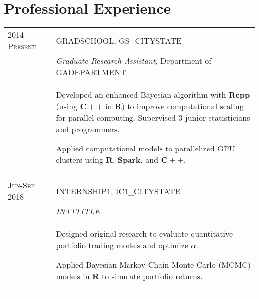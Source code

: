 \documentclass[a4paper,10pt]{article}
\begin{document}
\section{Professional Experience}
\begin{supertabular}{l p{0.55cm} p{13.9cm}}
	\textsc{2014-Present}				&& \textsc{GRADSCHOOL}, GS_CITYSTATE \\
	\small\textsc{}							&& \small	\emph{Graduate Research Assistant}, \small Department of GADEPARTMENT \\
															&& \begin{enumerate*}[label =$\diamond$,itemjoin={\newline}]
																	\item \footnotesize Developed an enhanced Bayesian algorithm with $\mathbf{Rcpp}$ (using $\mathbf{C++}$ in $\mathbf{R}$) to improve computational scaling for parallel computing. Supervised 3 junior statisticians and programmers.
																	\item \footnotesize Applied computational models to parallelized GPU clusters using $\mathbf{R}$, $\mathbf{Spark}$, and $\mathbf{C++}$.
																	\end{enumerate*} \vspace{2mm} \\

	 \\

	\textsc{Jun-Sep 2018}	&& \textsc{INTERNSHIP1}, IC1_CITYSTATE \\
												&& \small	\emph{INT1TITLE} \\
												&& \begin{enumerate*}[label =$\diamond$, itemjoin={\newline}]
													\item \footnotesize Designed original research to evaluate quantitative portfolio trading models and optimize $\alpha$.
													\item \footnotesize Applied Bayesian Markov Chain Monte Carlo (MCMC) models in $\mathbf{R}$ to simulate portfolio returns.	\end{enumerate*} \\
	 \\





\end{supertabular}
\end{document}
